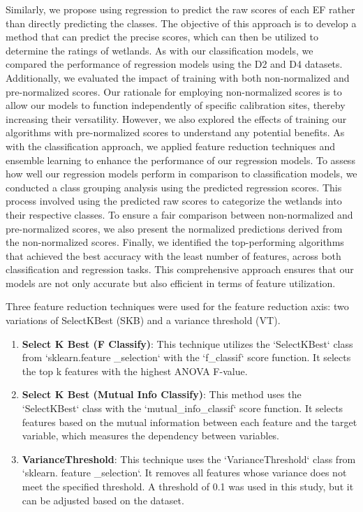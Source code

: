 \documentclass[12pt,letterpaper]{article}
\begin{document}
Similarly, we propose using regression to predict the raw scores of each \ac{EF} rather than directly predicting the classes.
The objective of this approach is to develop a method that can predict the precise scores, which can then be utilized to determine the ratings of wetlands.
As with our classification models, we compared the performance of regression models using the D2 and D4 datasets.
Additionally, we evaluated the impact of training with both non-normalized and pre-normalized scores.
Our rationale for employing non-normalized scores is to allow our models to function independently of specific calibration sites, thereby increasing their versatility.
However, we also explored the effects of training our algorithms with pre-normalized scores to understand any potential benefits.
As with the classification approach, we applied feature reduction techniques and ensemble learning to enhance the performance of our regression models.
To assess how well our regression models perform in comparison to classification models, we conducted a class grouping analysis using the predicted regression scores.
This process involved using the predicted raw scores to categorize the wetlands into their respective classes.
To ensure a fair comparison between non-normalized and pre-normalized scores, we also present the normalized predictions derived from the non-normalized scores.
Finally, we identified the top-performing algorithms that achieved the best accuracy with the least number of features, across both classification and regression tasks.
This comprehensive approach ensures that our models are not only accurate but also efficient in terms of feature utilization.

Three feature reduction techniques were used for the feature reduction axis: two variations of SelectKBest (\ac{SKB}) and a variance threshold (\ac{VT}).
\begin{enumerate}
    \item \textbf{Select K Best (F Classify)}: This technique utilizes the `SelectKBest` class from `sklearn.feature \_selection` with the `f\_classif` score function. It selects the top k features with the highest ANOVA F-value.
    
    \item \textbf{Select K Best (Mutual Info Classify)}: This method uses the `SelectKBest` class with the `mutual\_info\_classif` score function. It selects features based on the mutual information between each feature and the target variable, which measures the dependency between variables.

    \item \textbf{VarianceThreshold}: This technique uses the `VarianceThreshold` class from `sklearn. feature \_selection`. It removes all features whose variance does not meet the specified threshold. A threshold of 0.1 was used in this study, but it can be adjusted based on the dataset.
\end{enumerate}
\end{document}
